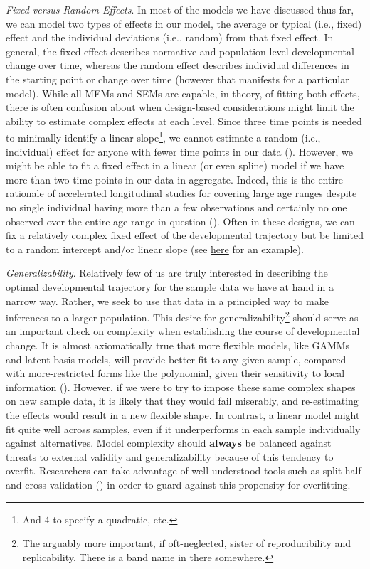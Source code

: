 \documentclass[11pt]{article}
\begin{document}
\qquad \textit{Fixed versus Random Effects}. In most of the models we have discussed thus far, we can model two types of effects in our model, the average or typical (i.e., fixed) effect and the individual deviations (i.e., random) from that fixed effect. In general, the fixed effect describes normative and population-level developmental change over time, whereas the random effect describes individual differences in the starting point or change over time (however that manifests for a particular model). While all MEMs and SEMs are capable, in theory, of fitting both effects, there is often confusion about when design-based considerations might limit the ability to estimate complex effects at each level. Since three time points is needed to minimally identify a linear slope\footnote{And 4 to specify a quadratic, etc.}, we cannot estimate a random (i.e., individual) effect for anyone with fewer time points in our data (\cite{parsons_dont_2022}). However, we might be able to fit a fixed effect in a linear (or even spline) model if we have more than two time points in our data in aggregate. Indeed, this is the entire rationale of accelerated longitudinal studies for covering large age ranges despite no single individual having more than a few observations and certainly no one observed over the entire age range in question (\cite{mccormick_multi-level_2021,mccormick_longitudinal_2021,sorensen_recipe_2021}). Often in these designs, we can fix a relatively complex fixed effect of the developmental trajectory but be limited to a random intercept and/or linear slope (see \href{https://e-m-mccormick.github.io/static/longitudinal-primer/04-shape.html#fixed-and-random-effects}{here} for an example).

\qquad \textit{Generalizability}. Relatively few of us are truly interested in describing the optimal developmental trajectory for the sample data we have at hand in a narrow way. Rather, we seek to use that data in a principled way to make inferences to a larger population. This desire for generalizability\footnote{The arguably more important, if oft-neglected, sister of reproducibility and replicability. There is a band name in there somewhere.} should serve as an important check on complexity when establishing the course of developmental change. It is almost axiomatically true that more flexible models, like GAMMs and latent-basis models, will provide better fit to any given sample, compared with more-restricted forms like the polynomial, given their sensitivity to local information (\cite{wood_right-sizing_2015}). However, if we were to try to impose these same complex shapes on new sample data, it is likely that they would fail miserably, and re-estimating the effects would result in a new flexible shape. In contrast, a linear model might fit quite well across samples, even if it underperforms in each sample individually against alternatives. Model complexity should \textbf{always} be balanced against threats to external validity and generalizability because of this tendency to overfit. Researchers can take advantage of well-understood tools such as split-half and cross-validation (\cite{de_rooij_cross-validation_2020}) in order to guard against this propensity for overfitting.
\end{document}
